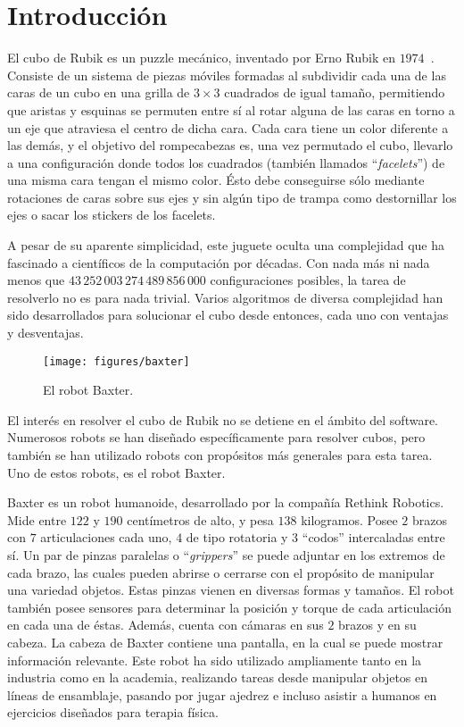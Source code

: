 \chapter{Introducción}

El cubo de Rubik es un puzzle mecánico, inventado por Erno Rubik en $1974$~\cite{ernorubik1974}. Consiste de un sistema de piezas móviles formadas al subdividir cada una de las caras de un cubo en una grilla de $3\times 3$ cuadrados de igual tamaño, permitiendo que aristas y esquinas se permuten entre sí al rotar alguna de las caras en torno a un eje que atraviesa el centro de dicha cara. Cada cara tiene un color diferente a las demás, y el objetivo del rompecabezas es, una vez permutado el cubo, llevarlo a una configuración donde todos los cuadrados (también llamados ``\emph{facelets}'') de una misma cara tengan el mismo color. Ésto debe conseguirse sólo mediante rotaciones de caras sobre sus ejes y sin algún tipo de trampa como destornillar los ejes o sacar los stickers de los facelets.

A pesar de su aparente simplicidad, este juguete oculta una complejidad que ha fascinado a científicos de la computación por décadas. Con nada más ni nada menos que $43\,252\,003\,274\,489\,856\,000$ configuraciones posibles\cite{mathematicsrubik}\cite{mathematicsrubik2}, la tarea de resolverlo no es para nada trivial. Varios algoritmos de diversa complejidad han sido desarrollados para solucionar el cubo desde entonces, cada uno con ventajas y desventajas.

\begin{figure}[ht]
	\centering
	\texttt{[image: figures/baxter]}
	\caption{El robot Baxter.}
	\label{baxter}
\end{figure}

El interés en resolver el cubo de Rubik no se detiene en el ámbito del software. Numerosos robots se han diseñado específicamente para resolver cubos, pero también se han utilizado robots con propósitos más generales para esta tarea. Uno de estos robots, es el robot Baxter.

Baxter es un robot humanoide, desarrollado por la compañía Rethink Robotics\cite{baxterproduct}. Mide entre $122$ y $190$ centímetros de alto, y pesa $138$ kilogramos. Posee $2$ brazos con $7$ articulaciones cada uno, $4$ de tipo rotatoria y $3$ ``codos'' intercaladas entre sí. Un par de pinzas paralelas o ``\emph{grippers}'' se puede adjuntar en los extremos de cada brazo, las cuales pueden abrirse o cerrarse con el propósito de manipular una variedad objetos. Estas pinzas vienen en diversas formas y tamaños. El robot también posee sensores para determinar la posición y torque de cada articulación en cada una de éstas. Además, cuenta con cámaras en sus $2$ brazos y en su cabeza. La cabeza de Baxter contiene una pantalla, en la cual se puede mostrar información relevante\cite{baxterspecs}.
Este robot ha sido utilizado ampliamente tanto en la industria como en la academia, realizando tareas desde manipular objetos en líneas de ensamblaje\cite{baxtersupply}, pasando por jugar ajedrez\cite{baxterchess} e incluso asistir a humanos en ejercicios diseñados para terapia física\cite{baxterassistive}.

